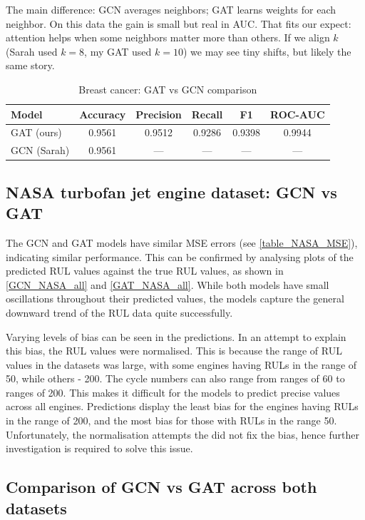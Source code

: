 \documentclass[12pt]{article}
\begin{document}
The main difference: GCN averages neighbors; GAT learns weights for each neighbor. On this data the gain is small but real in AUC. That fits our expect: attention helps when some neighbors matter more than others. If we align $k$ (Sarah used $k{=}8$, my GAT used $k{=}10$) we may see tiny shifts, but likely the same story.
\begin{table}[H]
\centering
\caption{Breast cancer: GAT vs GCN comparison}
\begin{tabular}{|l|c|c|c|c|c|}
\hline
\textbf{Model} & \textbf{Accuracy} & \textbf{Precision} & \textbf{Recall} & \textbf{F1} & \textbf{ROC-AUC} \\
\hline
GAT (ours) & 0.9561 & 0.9512 & 0.9286 & 0.9398 & 0.9944 \\
GCN (Sarah) & 0.9561 & --- & --- & --- & --- \\
\hline
\end{tabular}
\end{table}

\subsection{NASA turbofan jet engine dataset: GCN vs GAT}
The GCN and GAT models have similar MSE errors (see \autoref{table_NASA_MSE}), indicating similar performance. This can be confirmed by analysing plots of the predicted RUL values against the true RUL values, as shown in \autoref{GCN_NASA_all} and \autoref{GAT_NASA_all}. While both models have small oscillations throughout their predicted values, the models capture the general downward trend of the RUL data quite successfully. 

Varying levels of bias can be seen in the predictions. In an attempt to explain this bias, the RUL values were normalised. This is because the range of RUL values in the datasets was large, with some engines having RULs in the range of 50, while others - 200. The cycle numbers can also range from ranges of 60 to ranges of 200. This makes it difficult for the models to predict precise values across all engines. Predictions display the least bias for the engines having RULs in the range of 200, and the most bias for those with RULs in the range 50. Unfortunately, the normalisation attempts the did not fix the bias, hence further investigation is required to solve this issue.

\subsection{Comparison of GCN vs GAT across both datasets}
\end{document}
